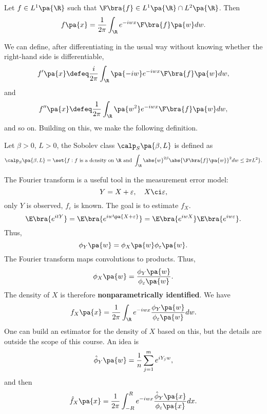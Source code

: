 Let $f\in L^1\pa{\R}$ such that $\F\bra{f}\in L^1\pa{\R}\cap L^2\pa{\R}$. Then
\begin{equation}
  f\pa{x} = \frac{1}{2\pi} \int_{\R} e^{-iwx}\F\bra{f}\pa{w} d w.
\end{equation}

We can define, after differentiating in the usual way without knowing whether the right-hand side is differentiable,
\begin{equation}
  f'\pa{x} \defeq \frac{i}{2\pi} \int_{\R} \pa{-iw} e^{-iwx} \F\bra{f}\pa{w}dw,
\end{equation}
and
\begin{equation}
  f''\pa{x} \defeq \frac{1}{2\pi} \int_\R \pa{w^2} e^{-iwx} \F\bra{f} \pa{w}dw,
\end{equation}
and so on. Building on this, we make the following definition.

\begin{definition}
  Let $\beta>0$, $L>0$, the Sobolev class $\calp_S\pa{\beta,L}$ is defined as
  \begin{equation}
    \calp_S\pa{\beta,L} = \set{f: f \text{ is a density on }  \R \text{ and } \int_{\R}\abs{w}^{2\beta} \abs{\F\bra{f}\pa{w}}^2 dw \leq 2\pi L^2}.
  \end{equation}
\end{definition}

\begin{remark}\label{rem:fourier_density_estimation}
  The Fourier transform is a useful tool in the measurement error model:
  \begin{equation}
    Y = X+ \varepsilon, \quad X\ci\varepsilon,
  \end{equation}
  only $Y$ is observed, $f_\varepsilon$ is known. The goal is to estimate $f_X$.
  \begin{equation}
    \E\bra{e^{itY}} = \E\bra{e^{iw\pa{X+\varepsilon}}} = \E\bra{e^{iwX}}\E\bra{e^{iw\varepsilon}}.
  \end{equation}
  Thus,
  \begin{equation}
  \phi_Y \pa{w} =  \phi_X\pa{w} \phi_{\varepsilon}\pa{w}.
  \end{equation}
  The Fourier transform maps convolutions to products. Thus,
  \begin{equation}
    \phi_X\pa{w} = \frac{\phi_Y\pa{w}}{\phi_{\varepsilon}\pa{w}}.
  \end{equation}
  The density of $X$ is therefore \textbf{nonparametrically identified}. We have
  \begin{equation}
    f_X\pa{x} = \frac{1}{2\pi} \int_{\R}e^{-iwx} \frac{\phi_Y\pa{w}}{\phi_{\varepsilon}\pa{w}}dw.
  \end{equation}
  One can build an estimator for the density of $X$ based on this, but the details are outside the scope of this course. An idea is
  \begin{equation}
    \hat{\phi}_Y\pa{w} =\frac{1}{n}\sum_{j=1}^m e^{iY_j w},
  \end{equation}
  and then
  \begin{equation}
    \hat{f}_X\pa{x} = \frac{1}{2\pi} \int_{-R}^R e^{-iwx} \frac{\hat{\phi}_Y\pa{x}}{\phi_{\varepsilon}\pa{x}}dx.
  \end{equation}
\end{remark}
